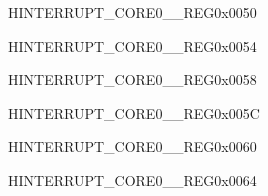 \begin{register}{H}{INTERRUPT\_CORE0\_\_REG}{0x0050}\label{regdesc:INTERRUPTCORE0I2S1INTMAPREG}






\end{register}\vspace{-3em}


\begin{register}{H}{INTERRUPT\_CORE0\_\_REG}{0x0054}\label{regdesc:INTERRUPTCORE0UARTINTRMAPREG}






\end{register}\vspace{-3em}


\begin{register}{H}{INTERRUPT\_CORE0\_\_REG}{0x0058}\label{regdesc:INTERRUPTCORE0UART1INTRMAPREG}






\end{register}\vspace{-3em}


\begin{register}{H}{INTERRUPT\_CORE0\_\_REG}{0x005C}\label{regdesc:INTERRUPTCORE0LEDCINTMAPREG}






\end{register}\vspace{-3em}


\begin{register}{H}{INTERRUPT\_CORE0\_\_REG}{0x0060}\label{regdesc:INTERRUPTCORE0EFUSEINTMAPREG}






\end{register}\vspace{-3em}


\begin{register}{H}{INTERRUPT\_CORE0\_\_REG}{0x0064}\label{regdesc:INTERRUPTCORE0TWAIINTMAPREG}






\end{register}\vspace{-3em}


